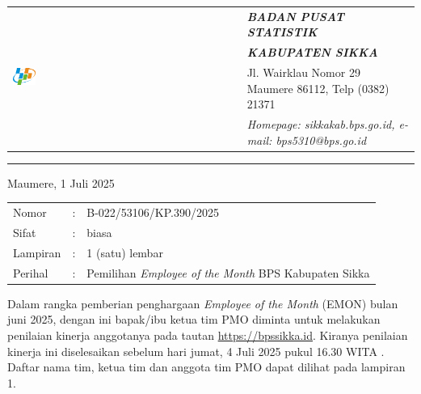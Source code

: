\documentclass{article}
\begin{document}




\begin{tabular}{ll}
   \multirow{4}{*}{\includegraphics[width=0.10\textwidth]{logo/bps-logo.png}} %
   &
   \large{\textbf{\textit{BADAN PUSAT STATISTIK}}} \\
   & \large{\textbf{\textit{KABUPATEN SIKKA}}} \\
   & Jl. Wairklau Nomor 29 Maumere 86112, Telp (0382) 21371 \\
   & \textit{Homepage: sikkakab.bps.go.id, e-mail: bps5310@bps.go.id} \\
\end{tabular}

\hfill

\vspace{-1em} %

\rule{\linewidth}{1pt} %


\hfill
Maumere, 1 Juli 2025

\begin{tabular}{@{} lcl}
	Nomor&:&B-022/53106/KP.390/2025 \\
	Sifat&:&biasa \\
	Lampiran&:&1 (satu) lembar\\
    Perihal&:& Pemilihan \textit{Employee of the Month} BPS Kabupaten Sikka\\
\end{tabular}

\bigskip %

Dalam rangka pemberian penghargaan \textit{Employee of the Month} (EMON) bulan juni 2025, dengan ini bapak/ibu ketua tim PMO diminta untuk melakukan penilaian kinerja anggotanya pada tautan \href{https://bpssikka.id/}{https://bpssikka.id}.
Kiranya penilaian kinerja ini diselesaikan sebelum hari jumat, 4 Juli 2025 pukul 16.30 WITA \@.
Daftar nama tim, ketua tim dan anggota tim PMO dapat dilihat pada lampiran 1.
\end{document}
